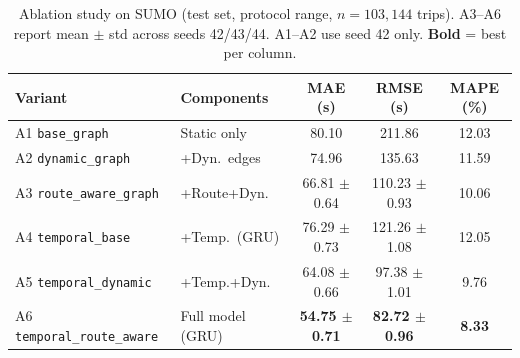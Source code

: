 \begin{table}[t]
    \centering
    \caption{Ablation study on SUMO (test set, protocol range, $n{=}103{,}144$ trips). A3--A6 report mean $\pm$ std across seeds 42/43/44. A1--A2 use seed 42 only. \textbf{Bold} = best per column.}
    \label{tab:ablation_sumo}
    {\footnotesize\setlength{\tabcolsep}{4pt}%
    \begin{tabular}{@{}llccc@{}}
        \toprule
        \textbf{Variant} & \textbf{Components} & \textbf{MAE (s)} & \textbf{RMSE (s)} & \textbf{MAPE (\%)} \\
        \midrule
        A1 \texttt{base\_graph}            & Static only         & 80.10 & 211.86 & 12.03 \\
        A2 \texttt{dynamic\_graph}         & +Dyn.\ edges        & 74.96 & 135.63 & 11.59 \\
        A3 \texttt{route\_aware\_graph}    & +Route+Dyn.\        & 66.81 $\pm$ 0.64 & 110.23 $\pm$ 0.93 & 10.06 \\
        A4 \texttt{temporal\_base}         & +Temp.\ (GRU)       & 76.29 $\pm$ 0.73 & 121.26 $\pm$ 1.08 & 12.05 \\
        A5 \texttt{temporal\_dynamic}      & +Temp.+Dyn.\        & 64.08 $\pm$ 0.66 & 97.38 $\pm$ 1.01 & 9.76 \\
        A6 \texttt{temporal\_route\_aware} & Full model (GRU)    & \textbf{54.75 $\pm$ 0.71} & \textbf{82.72 $\pm$ 0.96} & \textbf{8.33} \\
        \bottomrule
    \end{tabular}}%
\end{table}

